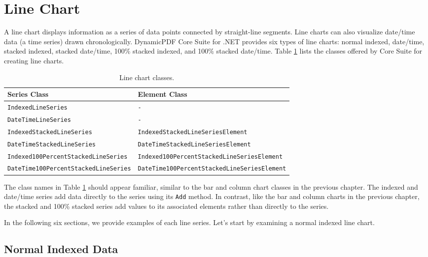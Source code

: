 \documentclass[american]{tufte-book}
\providecommand{\tabularnewline}{\\}
\numberwithin{equation}{section}
\numberwithin{figure}{section}
\begin{document}
{\section{Line Chart}\label{sec:Line-Chart}

A line chart displays information as a series of data points connected
by straight-line segments. Line charts can also visualize date/time
data (a time series) drawn chronologically. DynamicPDF Core Suite
for .NET provides six types of line charts: normal indexed, date/time,
stacked indexed, stacked date/time, 100\% stacked indexed, and 100\%
stacked date/time. Table \ref{tab:line-chart-Core-Suite-classes-1-1}
lists the classes offered by Core Suite for creating line charts.

\begin{table}
\raggedright
\begin{tabular}{p{}p{}}
\toprule 
{\scriptsize Series Class} & {\scriptsize Element Class}\tabularnewline
\midrule
{\scriptsize\texttt{IndexedLineSeries}} & {\scriptsize\texttt{-}}\tabularnewline
{\scriptsize\texttt{DateTimeLineSeries}} & {\scriptsize\texttt{-}}\tabularnewline
{\scriptsize\texttt{IndexedStackedLineSeries}} & {\scriptsize\texttt{IndexedStackedLineSeriesElement}}\tabularnewline
{\scriptsize\texttt{DateTimeStackedLineSeries}} & {\scriptsize\texttt{DateTimeStackedLineSeriesElement}}\tabularnewline
{\scriptsize\texttt{Indexed100PercentStacked\-LineSeries}} & {\scriptsize\texttt{Indexed100PercentStackedLine\-SeriesElement}}\tabularnewline
{\scriptsize\texttt{DateTime100PercentStacked\-LineSeries}} & {\scriptsize\texttt{DateTime100PercentStackedLine\-SeriesElement}}\tabularnewline
\bottomrule
\end{tabular}\caption{Line chart classes.}\label{tab:line-chart-Core-Suite-classes-1-1}
\end{table}
\medskip{}
The class names in Table \ref{tab:line-chart-Core-Suite-classes-1-1}
should appear familiar, similar to the bar and column chart classes
in the previous chapter. The indexed and date/time series add data
directly to the series using its \texttt{Add} method. In contrast,
like the bar and column charts in the previous chapter, the stacked
and 100\% stacked series add values to its associated elements rather
than directly to the series. 

In the following six sections, we provide examples of each line series.
Let's start by examining a normal indexed line chart.

\subsection{Normal Indexed Data}

}
\end{document}
